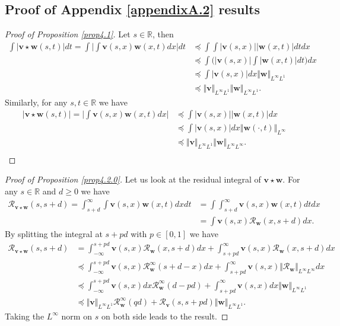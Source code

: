 \documentclass[reqno,final,11pt]{amsart}
\theoremstyle{plain}
\theoremstyle{definition}
\theoremstyle{remark}
\newcommand{\R}{\mathds{R}}
\newcommand{\itg}{\displaystyle\int}
\newcommand{\Vity}[1]{\Vert #1 \Vert_{L^{\infty}}}
\newcommand{\Vityty}[1]{\Vert #1 \Vert_{L^{\infty}L^{\infty}}}
\newcommand{\Vityone}[1]{\Vert #1 \Vert_{L^{\infty}L^{1}}}
\newcommand{\Res}{\mathcal{R}}
\begin{document}
\subsection{Proof of Appendix \ref{appendixA.2} results}

\begin{proof}[Proof of Proposition \ref{prop4.1}]
	Let $s\in\R$, then
	\begin{align*}
		\itg \vert \bm{v}\star\bm{w}(s,t) \vert dt  = \itg \Big\vert\itg \bm{v}(s,x) \bm{w}(x,t)dx \Big\vert dt & \preceq \itg \itg \vert \bm{v}(s,x) \vert  \vert \bm{w}(x,t) \vert dt dx \\
		& \preceq \itg \Big(\vert \bm{v}(s,x) \vert \itg   \vert \bm{w}(x,t) \vert dt\Big) dx \\
		& \preceq \itg \vert \bm{v}(s,x) \vert dx \Vityone{
		\bm{w}} \\
		& \preceq \Vityone{\bm{v}}\Vityone{\bm{w}}.
	\end{align*}
	Similarly, for any $s,t\in\R$ we have
	\begin{align*}
		\vert \bm{v}\star\bm{w}(s,t) \vert  =  \Big\vert\itg \bm{v}(s,x) \bm{w}(x,t)dx \Big\vert & \preceq \itg \vert \bm{v}(s,x)\vert \vert \bm{w}(x,t)\vert dx\\
		& \preceq \itg \vert \bm{v}(s,x)\vert  dx \Vity{\bm{w}(\cdot,t)}\\
		& \preceq \Vityone{\bm{v}} \Vityty{\bm{w}}.\\
	\end{align*}
\end{proof}

\begin{proof}[Proof of Proposition \ref{prop4.2.0}]
	Let us look at the residual integral of $\bm{v}\star\bm{w}$. For any $s\in\R$ and $d\geq 0$ we have
\begin{align*}
	\Res_{\bm{v}\star\bm{w}}(s,s+d)  = \itg_{s+d}^{\infty} \itg \bm{v}(s,x) \bm{w}(x,t)dxdt & = \itg \itg_{s+d}^{\infty}  \bm{v}(s,x) \bm{w}(x,t)dtdx \\
	& = \itg \bm{v}(s,x) \Res_{\bm{w}}(x,s+d)dx.
\end{align*}
By splitting the integral at $s+pd$ with $p\in [0,1]$ we have
\begin{align*}
	\Res_{\bm{v}\star\bm{w}}(s,s+d) & = \itg_{-\infty}^{s+pd} \bm{v}(s,x) \Res_{\bm{w}}(x,s+d)dx + \itg_{s+pd}^{\infty} \bm{v}(s,x) \Res_{\bm{w}}(x,s+d)dx\\
	& \preceq \itg_{-\infty}^{s+pd} \bm{v}(s,x) \Res_{\bm{w}}^{\infty}(s+d-x)dx + \itg_{s+pd}^{\infty} \bm{v}(s,x) \Vityty{\Res_{\bm{w}}}dx\\
	& \preceq \itg_{-\infty}^{s+pd} \bm{v}(s,x) dx \Res_{\bm{w}}^{\infty}(d-pd) + \itg_{s+pd}^{\infty} \bm{v}(s,x) dx \Vityone{\bm{w}}\\
	& \preceq \Vityone{\bm{v}} \Res_{\bm{w}}^{\infty}(qd) + \Res_{\bm{v}}(s,s+pd) \Vityone{\bm{w}}.
\end{align*}
Taking the $L^{\infty}$ norm on $s$ on both side leads to the result.
\end{proof}
\end{document}
